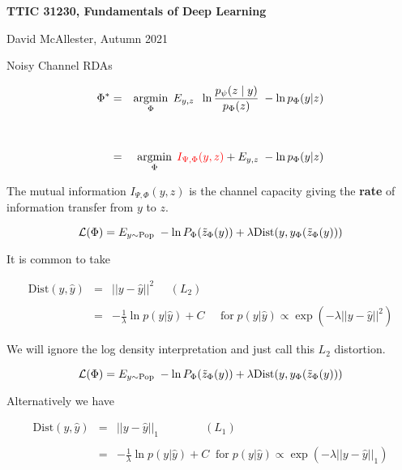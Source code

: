 




{\Huge

  \centerline{\bf TTIC 31230, Fundamentals of Deep Learning}
  \bigskip
  \centerline{David McAllester, Autumn 2021}
  \vfill
  \centerline{Noisy Channel RDAs}
  \vfill
  \vfill



\begin{eqnarray*}
\Phi^* & = & \operatorname*{argmin}_\Phi\; E_{y,z} \;\; \ln \frac{p_\psi(z\; |\; y)}{p_\Phi(z)}\; - \ln p_\Phi(y|z) \\
\\
\\
 & = & \operatorname*{argmin}_\Phi \;{\color{red} I_{\Psi,\Phi}(y,z)} + E_{y,z}\; - \ln p_\Phi(y|z)
\end{eqnarray*}

\vfill
The mutual information {\color{red} $I_{\Psi,\Phi}(y,z)$} is the channel capacity giving the {\bf rate} of information transfer from $y$ to $z$.


$${\cal L}(\Phi) = E_{y \sim \mathrm{Pop}}\;-\ln P_\Phi(\tilde{z}_\Phi(y)) + \lambda\mathrm{Dist}(y,y_\Phi(\tilde{z}_\Phi(y)))$$

\vfill
It is common to take

\begin{eqnarray*}
\mathrm{Dist}(y,\hat{y}) & = & ||y-\hat{y}||^2 \;\;\;\;\;(L_2) \\
\\
& = & -\frac{1}{\lambda}\ln p(y|\hat{y}) + C \;\;\;\;\;\mbox{for}\;p(y|\hat{y}) \propto \exp(-\lambda||y-\hat{y}||^2)
\end{eqnarray*}

\vfill
We will ignore the log density interpretation and just call this $L_2$ distortion.


$${\cal L}(\Phi) = E_{y \sim \mathrm{Pop}}\;-\ln P_\Phi(\tilde{z}_\Phi(y)) + \lambda \mathrm{Dist}(y,y_\Phi(\tilde{z}_\Phi(y)))$$

Alternatively we have

\begin{eqnarray*}
\mathrm{Dist}(y,\hat{y}) & = & ||y-\hat{y}||_1 \hspace{4em}(L_1) \\
\\
& = & -\frac{1}{\lambda}\ln p(y|\hat{y}) + C \;\;\mbox{for}\;p(y|\hat{y}) \propto \exp(-\lambda ||y-\hat{y}||_1)
\end{eqnarray*}

}
